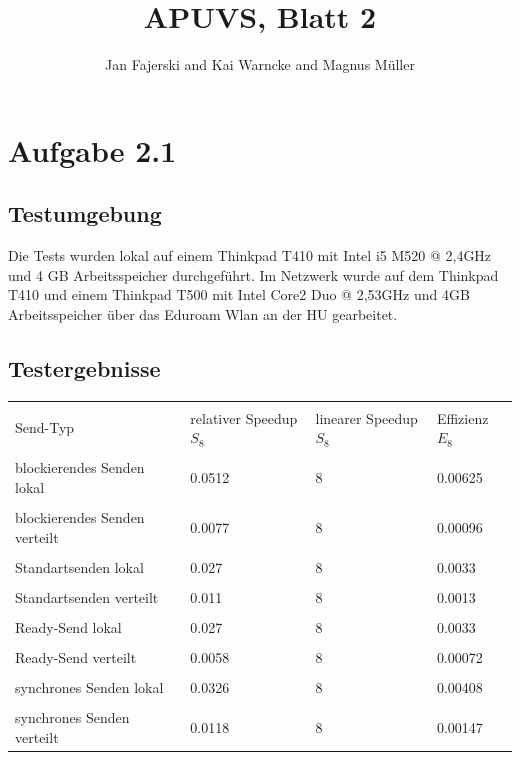 \documentclass[a4paper,
12pt,
BCOR12mm,
]{scrartcl}
\title{APUVS, Blatt 2}
\author{Jan Fajerski and Kai Warncke and Magnus Müller}
\begin{document}
\maketitle  

\section*{Aufgabe 2.1}
  \subsection*{Testumgebung}
    Die Tests wurden lokal auf einem Thinkpad T410 mit Intel i5 M520 @ 2,4GHz und 4 GB Arbeitsspeicher durchgeführt.
    Im Netzwerk wurde auf dem Thinkpad T410 und einem Thinkpad T500 mit Intel Core2 Duo @ 2,53GHz und 4GB Arbeitsspeicher über das Eduroam Wlan
    an der HU gearbeitet.
  \subsection*{Testergebnisse}
    \begin{tabular}{|p{3cm}|p{3cm}|p{3cm}|p{3cm}|}
      \hline &&&\\
      Send-Typ                      & relativer Speedup $S_8$       & linearer Speedup  $S_8$       & Effizienz $E_8$   \\
      \hline &&&\\
      blockierendes Senden lokal    & 0.0512                        & 8                             & 0.00625           \\
      \hline &&&\\
      blockierendes Senden verteilt & 0.0077                        & 8                             & 0.00096           \\
      \hline &&&\\
      Standartsenden lokal          & 0.027                         & 8                             & 0.0033            \\
      \hline &&&\\
      Standartsenden verteilt       & 0.011                         & 8                             & 0.0013            \\
      \hline &&&\\
      Ready-Send lokal              & 0.027                         & 8                             & 0.0033            \\
      \hline &&&\\
      Ready-Send verteilt           & 0.0058                        & 8                             & 0.00072           \\
      \hline &&&\\
      synchrones Senden lokal       & 0.0326                        & 8                             & 0.00408           \\
      \hline &&&\\
      synchrones Senden verteilt    & 0.0118                        & 8                             & 0.00147           \\
      \hline 
    \end{tabular}
\end{document}
